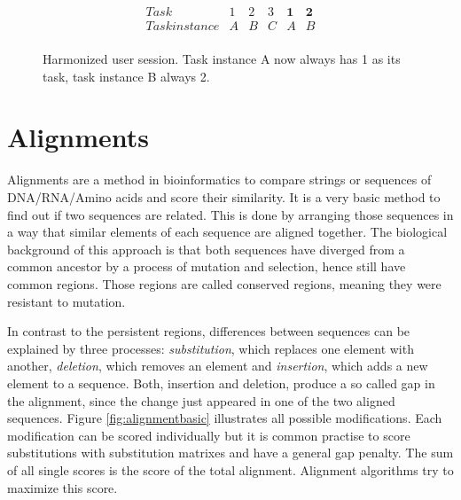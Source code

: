 \begin{figure}
\[
\begin{array}{r|ccccc}
	Task & 1 & 2 & 3 & \textbf{1} & \textbf{2}\\
	\hline
	Task instance & A & B & C & A & B\\
\end{array}
\]
\caption{Harmonized user session. Task instance A now always has 1 as its task, task instance B always 2.}
\label{fig:harmonized}
\end{figure}

\section{Alignments}
\label{sec:alignments}
Alignments are a method in bioinformatics to compare strings or sequences of DNA/RNA/Amino acids and score their similarity.
It is a very basic method to find out if two sequences are related.
This is done by arranging those sequences in a way that similar elements of each sequence are aligned together. The biological background of this approach is that
both sequences have diverged from a common ancestor by a process of mutation and selection\cite{durbin1998}, hence still have common regions. Those regions are called conserved regions, meaning they were resistant to mutation.

In contrast to the persistent regions, differences between sequences can be explained by three processes: \textit{substitution}, which replaces one element with another,  \textit{deletion}, which removes an element and \textit{insertion}, which adds a new element to a sequence.
Both, insertion and deletion, produce a so called gap in the alignment, since the change just appeared in one of the two aligned sequences. Figure \ref{fig:alignmentbasic} illustrates all possible modifications.
Each modification can be scored individually but it is common practise to score substitutions with substitution matrixes and have a general gap penalty. The sum of all single scores is the score of the total alignment.
Alignment algorithms try to maximize this score.

